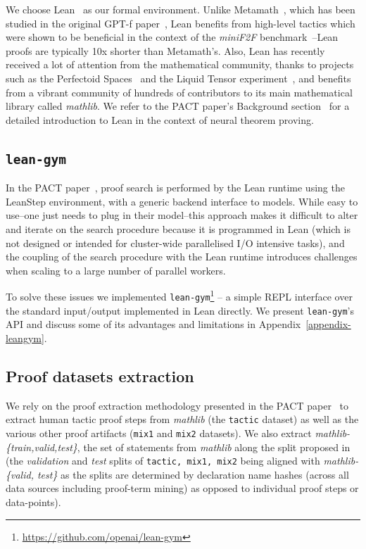 \documentclass[nohyperref]{article}
\theoremstyle{plain}
\theoremstyle{definition}
\theoremstyle{remark}
\begin{document}
We choose Lean~\cite{de2015lean,leanprover} as our formal environment. Unlike Metamath~\cite{megill2019metamath}, which has been studied in the original GPT-f paper~\cite{polu2020generative}, Lean benefits from high-level tactics which were shown to be beneficial in the context of the \textit{miniF2F} benchmark~\cite{zheng2021minif2f}--Lean proofs are typically 10x shorter than Metamath's. Also, Lean has recently received a lot of attention from the mathematical community, thanks to projects such as the Perfectoid Spaces~\citep{perfectoidspaces} and the Liquid Tensor experiment~\citep{liquidtensor}, and benefits from a vibrant community of hundreds of contributors to its main mathematical library called \textit{mathlib}. We refer to the {\sc PACT} paper's Background section~\cite{han2021proof} for a detailed introduction to Lean in the context of neural theorem proving.

\subsection{\texttt{lean-gym}}

In the {\sc PACT} paper~\cite{han2021proof}, proof search is performed by the Lean runtime using the {\sc LeanStep} environment, with a generic backend interface to models. While easy to use--one just needs to plug in their model--this approach makes it difficult to alter and iterate on the search procedure because it is programmed in Lean (which is not designed or intended for cluster-wide parallelised I/O intensive tasks), and the coupling of the search procedure with the Lean runtime introduces challenges when scaling to a large number of parallel workers.

To solve these issues we implemented \texttt{lean-gym}\footnote{\url{https://github.com/openai/lean-gym}} -- a simple REPL interface over the standard input/output implemented in Lean directly. We present \texttt{lean-gym}'s API and discuss some of its advantages and limitations in Appendix~\ref{appendix-leangym}.

\subsection{Proof datasets extraction}

We rely on the proof extraction methodology presented in the {\sc PACT} paper~\cite{han2021proof} to extract human tactic proof steps from \textit{mathlib} (the \texttt{tactic} dataset) as well as the various other proof artifacts (\texttt{mix1} and \texttt{mix2} datasets). We also extract \textit{mathlib-\{train,valid,test\}}, the set of statements from \textit{mathlib} along the split proposed in \citet{han2021proof} (the \textit{validation} and \textit{test} splits of \texttt{tactic, mix1, mix2} being aligned with \textit{mathlib-\{valid, test\}} as the splits are determined by declaration name hashes (across all data sources including proof-term mining) as opposed to individual proof steps or data-points).
\end{document}
